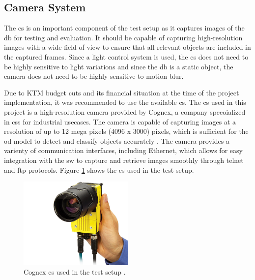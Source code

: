 \subsection{Camera System}
The \gls{cs} is an important component of the test setup as it captures images of the \gls{db} for testing and evaluation. It should be capable of capturing high-resolution images with a wide field of view to ensure that all relevant objects are included in the captured frames. Since a light control system is used, the \gls{cs} does not need to be highly sensitive to light variations and since the \gls{db} is a static object, the camera does not need to be highly sensitive to motion blur.

Due to KTM budget cuts and its financial situation at the time of the project implementation, it was recommended to use the available \gls{cs}. The \gls{cs} used in this project is a high-resolution camera provided by Cognex, a company specoialized in \gls{cs}s for industrial usecases. The camera is capable of capturing images at a resolution of up to 12 mega pixels (4096 x 3000) pixels, which is sufficient for the \gls{od} model to detect and classify objects accurately \cite{Cognex_Camera}. The camera provides a varienty of communication interfaces, including Ethernet, which allows for easy integration with the \gls{sw} to capture and retrieve images smoothly through \gls{telnet} and \gls{ftp} protocols. Figure \ref{Cognex_Camera} shows the \gls{cs} used in the test setup.

\begin{figure}[!htb]
    \centering
    \includegraphics[width=0.5\textwidth]{Figures/In-Sight 9000 in hand.jpg}
    \caption{Cognex \gls{cs} used in the test setup \cite{Cognex_Camera}.}
    \label{Cognex_Camera}
\end{figure}


